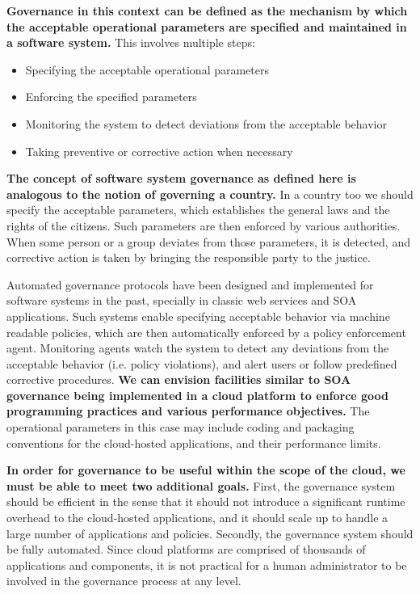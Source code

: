 \textbf{Governance in this context can be defined as the mechanism by which the acceptable 
operational parameters are specified and maintained in a software system.} This involves 
multiple steps:
\begin{itemize}
\item Specifying the acceptable operational parameters
\item Enforcing the specified parameters
\item Monitoring the system to detect deviations from the acceptable behavior
\item Taking preventive or corrective action when necessary
\end{itemize}

\textbf{The concept of software system governance as defined here is analogous to the
notion of governing a country.} In a country too we should specify the acceptable
parameters, which establishes the general laws and the rights of the citizens. Such 
parameters are then
enforced by various authorities. When some person or a group deviates from those parameters,
it is detected, and corrective action is taken by bringing the responsible party to the justice.

Automated governance protocols have been designed and implemented for software systems in
the past, specially in classic web services and SOA applications. Such systems enable specifying
acceptable behavior via machine readable policies, which are then automatically enforced by
a policy enforcement agent. Monitoring agents watch the system to detect any deviations from
the acceptable behavior (i.e. policy violations), and alert users or follow predefined corrective
procedures. \textbf{We can envision facilities similar to SOA governance being implemented in a cloud platform to 
enforce good programming practices and various performance objectives.} The operational
parameters in this case may include coding and packaging conventions for the cloud-hosted
applications, and their performance limits.

\textbf{In order for governance to be
useful within the scope of the cloud, we must be able to meet two additional
goals.} First, the governance system should be efficient in the sense that it should not introduce
a significant runtime overhead to the cloud-hosted applications, and it should scale up to
handle a large number of applications and policies. Secondly, the governance system should be
fully automated. Since cloud platforms are comprised of thousands of applications and components,
it is not practical for a human administrator to be involved in the governance process at any level.

